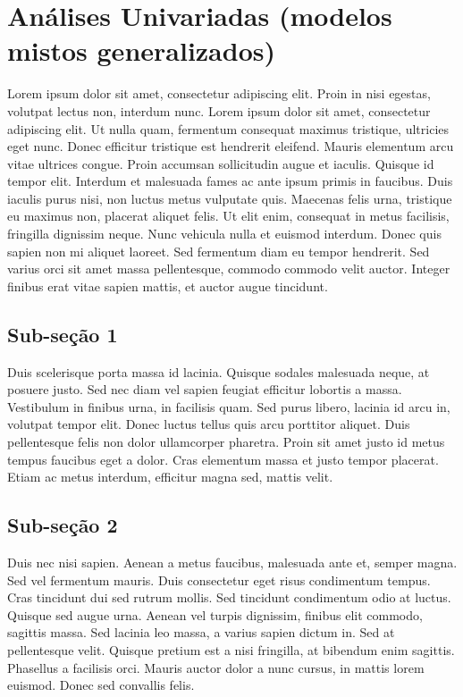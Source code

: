 \documentclass[]{book}
\begin{document}
\hypertarget{anuxe1lises-univariadas-modelos-mistos-generalizados}{%
\chapter{Análises Univariadas (modelos mistos generalizados)}\label{anuxe1lises-univariadas-modelos-mistos-generalizados}}

Lorem ipsum dolor sit amet, consectetur adipiscing elit. Proin in nisi egestas, volutpat lectus non, interdum nunc. Lorem ipsum dolor sit amet, consectetur adipiscing elit. Ut nulla quam, fermentum consequat maximus tristique, ultricies eget nunc. Donec efficitur tristique est hendrerit eleifend. Mauris elementum arcu vitae ultrices congue. Proin accumsan sollicitudin augue et iaculis. Quisque id tempor elit. Interdum et malesuada fames ac ante ipsum primis in faucibus. Duis iaculis purus nisi, non luctus metus vulputate quis. Maecenas felis urna, tristique eu maximus non, placerat aliquet felis. Ut elit enim, consequat in metus facilisis, fringilla dignissim neque. Nunc vehicula nulla et euismod interdum. Donec quis sapien non mi aliquet laoreet. Sed fermentum diam eu tempor hendrerit. Sed varius orci sit amet massa pellentesque, commodo commodo velit auctor. Integer finibus erat vitae sapien mattis, et auctor augue tincidunt.

\hypertarget{sub-seuxe7uxe3o-1-2}{%
\section{Sub-seção 1}\label{sub-seuxe7uxe3o-1-2}}

Duis scelerisque porta massa id lacinia. Quisque sodales malesuada neque, at posuere justo. Sed nec diam vel sapien feugiat efficitur lobortis a massa. Vestibulum in finibus urna, in facilisis quam. Sed purus libero, lacinia id arcu in, volutpat tempor elit. Donec luctus tellus quis arcu porttitor aliquet. Duis pellentesque felis non dolor ullamcorper pharetra. Proin sit amet justo id metus tempus faucibus eget a dolor. Cras elementum massa et justo tempor placerat. Etiam ac metus interdum, efficitur magna sed, mattis velit.

\hypertarget{sub-seuxe7uxe3o-2-2}{%
\section{Sub-seção 2}\label{sub-seuxe7uxe3o-2-2}}

Duis nec nisi sapien. Aenean a metus faucibus, malesuada ante et, semper magna. Sed vel fermentum mauris. Duis consectetur eget risus condimentum tempus. Cras tincidunt dui sed rutrum mollis. Sed tincidunt condimentum odio at luctus. Quisque sed augue urna. Aenean vel turpis dignissim, finibus elit commodo, sagittis massa. Sed lacinia leo massa, a varius sapien dictum in. Sed at pellentesque velit. Quisque pretium est a nisi fringilla, at bibendum enim sagittis. Phasellus a facilisis orci. Mauris auctor dolor a nunc cursus, in mattis lorem euismod. Donec sed convallis felis.
\end{document}
